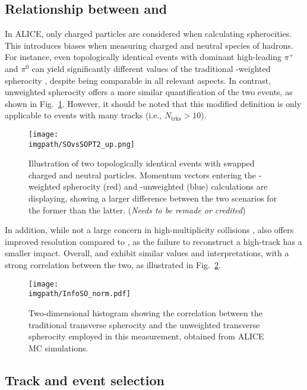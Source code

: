 \subsection{Relationship between \SOPT and \SO}

In ALICE, only charged particles are considered when calculating spherocities. This introduces biases when measuring charged and neutral species of hadrons. For instance, even topologically identical events with dominant high-\pt leading $\pi^+$ and $\pi^0$ can yield significantly different values of the traditional \pt-weighted spherocity \SO, despite being comparable in all relevant aspects. In contrast, unweighted spherocity \SOPT offers a more similar quantification of the two events, as shown in Fig.~\ref{fig:sphero:sOvssOpt}. However, it should be noted that this modified definition is only applicable to events with many tracks (i.e., $N_{\textrm{trks}}>10$).

\begin{figure}%
\texttt{[image: \\imgpath/SOvsSOPT2\_up.png]}
\caption{Illustration of two topologically identical events with swapped charged and neutral particles. Momentum vectors entering the \pt-weighted spherocity (red) and \pt-unweighted (blue) calculations are displaying, showing a larger difference between the two scenarios for the former than the latter. (\textit{Needs to be remade or credited})}
\label{fig:sphero:sOvssOpt}
\end{figure}

In addition, while not a large concern in high-multiplicity collisions \cite{alicecollaborationChargedparticleProductionFunction2019}, \SOPT also offers improved resolution compared to \SO, as the failure to reconstruct a high-\pt track has a smaller impact. Overall, \SO and \SOPT exhibit similar values and interpretations, with a strong correlation between the two, as illustrated in Fig.~\ref{fig:sphero:sOvssOptcorr}.

\begin{figure}%
\texttt{[image: \\imgpath/InfoSO\_norm.pdf]}
\caption{Two-dimensional histogram showing the correlation between the traditional transverse spherocity \SO and the unweighted transverse spherocity \SOPT employed in this measurement, obtained from ALICE MC simulations.}
\label{fig:sphero:sOvssOptcorr}
\end{figure}

\subsection{Track and event selection}\label{sec:sphero:eventtracks}

